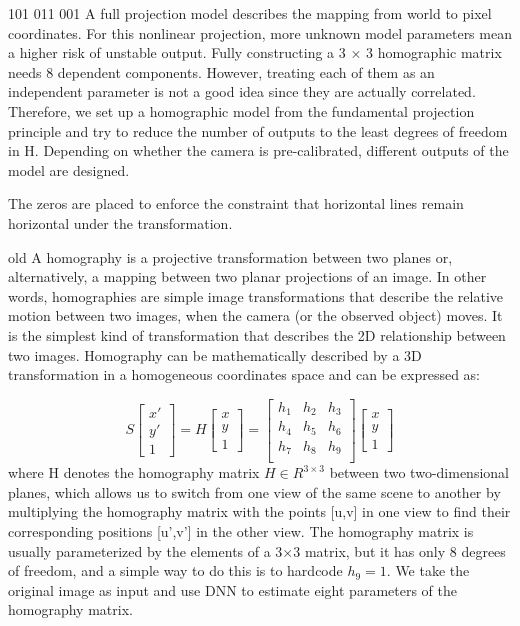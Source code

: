 101
011
001
A full projection model describes the mapping from world to pixel coordinates.
For this nonlinear projection, more unknown model parameters mean a higher risk of unstable output.
Fully constructing a 3 × 3 homographic matrix needs 8 dependent components.
However, treating each of them as an independent parameter is not a good idea since they are actually correlated.
Therefore, we set up a homographic model from the fundamental projection principle and try to reduce the number of outputs to the least degrees of freedom in H.
Depending on whether the camera is pre-calibrated, different outputs of the model are designed.

The zeros are placed to enforce the constraint that horizontal lines remain horizontal under the transformation.

old
A homography is a projective transformation between two planes or, alternatively, a mapping between two planar projections of an image.
In other words, homographies are simple image transformations that describe the relative motion between two images, when the camera (or the observed object) moves.
It is the simplest kind of transformation that describes the 2D relationship between two images.
Homography can be mathematically described by a 3D transformation in a homogeneous coordinates space and can be expressed as:

\[
S\left[ \begin{matrix}
   x'  \\
   y'  \\
   1
\end{matrix} \right]
=
H\left[ \begin{matrix}
   x  \\
   y  \\
   1
\end{matrix} \right]
=
\left[ \begin{matrix}
h_1 & h_2 & h_3  \\
h_4 & h_5 & h_6  \\
h_7 & h_8 & h_9  \\
\end{matrix} \right]
\left[ \begin{matrix}
x  \\
y  \\
1
\end{matrix} \right]
\]
where H denotes the homography matrix $H \in R^{3\times 3}$ between two two-dimensional planes,
which allows us to switch from one view of the same scene to another by multiplying
the homography matrix with the points [u,v] in one view to find their corresponding positions [u',v'] in the other view.
The homography matrix is usually parameterized by the elements of a 3×3 matrix,
but it has only 8 degrees of freedom, and a simple way to do this is to hardcode $h_9=1$.
We take the original image as input and use DNN to estimate eight parameters of the homography matrix.


